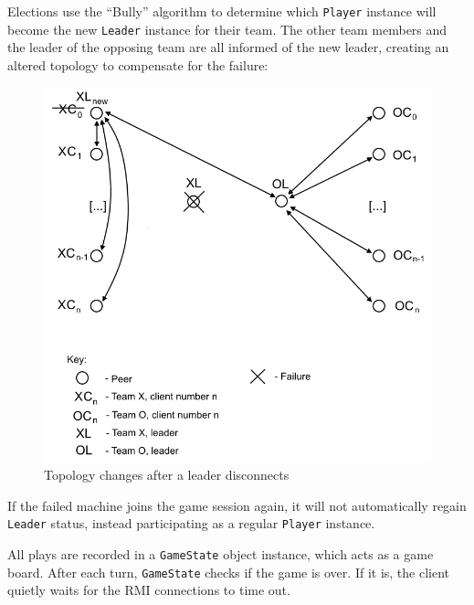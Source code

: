 \documentclass[conference]{IEEEtran}
\begin{document}
Elections use the ``Bully'' algorithm to determine which \texttt{Player} instance will become the new \texttt{Leader} instance for their team. The other team members and the leader of the opposing team are all informed of the new leader, creating an altered topology to compensate for the failure:

\begin{figure}[h]
	\includegraphics[width=\linewidth]{images/DAS-topology-election.png}
	\caption{Topology changes after a leader disconnects}
	\label{fig:topology-election}
\end{figure}

If the failed machine joins the game session again, it will not automatically regain \texttt{Leader} status, instead participating as a regular \texttt{Player} instance.

All plays are recorded in a \texttt{GameState} object instance, which
acts as a game board. After each turn, \texttt{GameState} checks if
the game is over. If it is, the client quietly waits for the RMI
connections to time out.

\end{document}
